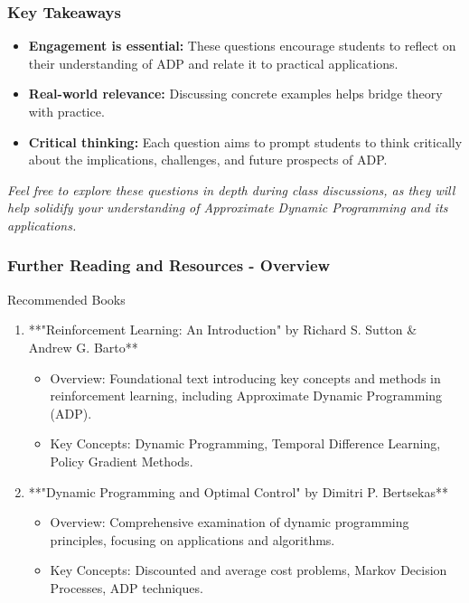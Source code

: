 \documentclass[aspectratio=169]{beamer}
\begin{document}
\begin{frame}[fragile]
    \frametitle{Key Takeaways}
    \begin{itemize}
        \item \textbf{Engagement is essential:} These questions encourage students to reflect on their understanding of ADP and relate it to practical applications.
        \item \textbf{Real-world relevance:} Discussing concrete examples helps bridge theory with practice.
        \item \textbf{Critical thinking:} Each question aims to prompt students to think critically about the implications, challenges, and future prospects of ADP.
    \end{itemize}
    \textit{Feel free to explore these questions in depth during class discussions, as they will help solidify your understanding of Approximate Dynamic Programming and its applications.}
\end{frame}

\begin{frame}[fragile]
    \frametitle{Further Reading and Resources - Overview}
    \begin{block}{Recommended Books}
        \begin{enumerate}
            \item **"Reinforcement Learning: An Introduction" by Richard S. Sutton \& Andrew G. Barto**
                \begin{itemize}
                    \item Overview: Foundational text introducing key concepts and methods in reinforcement learning, including Approximate Dynamic Programming (ADP).
                    \item Key Concepts: Dynamic Programming, Temporal Difference Learning, Policy Gradient Methods.
                \end{itemize}
            \item **"Dynamic Programming and Optimal Control" by Dimitri P. Bertsekas**
                \begin{itemize}
                    \item Overview: Comprehensive examination of dynamic programming principles, focusing on applications and algorithms.
                    \item Key Concepts: Discounted and average cost problems, Markov Decision Processes, ADP techniques.
                \end{itemize}
        \end{enumerate}
    \end{block}
\end{frame}
\end{document}
